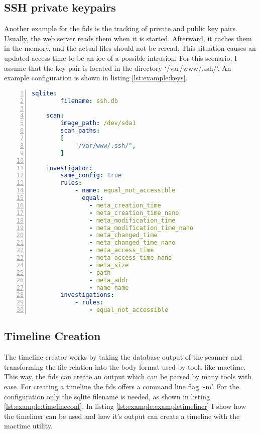 \subsection{SSH private keypairs}

Another example for the \gls{fids} is the tracking of private and public key pairs. Usually, the web server reads them when it is started. Afterward, it caches them in the memory, and the actual files should not be reread. This situation causes an updated access time to be an \gls{ioc} of a possible intrusion. For this scenario, I assume that the key pair is located in the directory `/var/www/.ssh/'. An example configuration is shown in listing \ref{lst:example:keys}.

\begin{lstlisting}[language=yaml, numbers=left, caption=Example SSH Keypair Configuration, label=lst:example:keys]
    sqlite:
        filename: ssh.db
        
    scan:
        image_path: /dev/sda1
        scan_paths: 
        [
            "/var/www/.ssh/",
        ]

    investigator:
        same_config: True
        rules: 
            - name: equal_not_accessible
              equal:
                - meta_creation_time
                - meta_creation_time_nano
                - meta_modification_time
                - meta_modification_time_nano
                - meta_changed_time
                - meta_changed_time_nano
                - meta_access_time
                - meta_access_time_nano
                - meta_size
                - path
                - meta_addr
                - name_name
        investigations:
            - rules:
                - equal_not_accessible

\end{lstlisting}

\subsection{Timeline Creation}

The timeline creator works by taking the database output of the scanner and transforming the file relation into the body format used by tools like mactime. This way, the \gls{fids} can create an output which can be parsed by many tools with ease. For creating a timeline the \gls{fids} offers a command line flag `-m'. For the configuration only the sqlite filename is needed, as shown in listing \ref{lst:example:timelineconf}. In listing \ref{lst:example:exampletimeliner} I show how the timeliner can be used and how it's output can create a timeline with the mactime utility.

